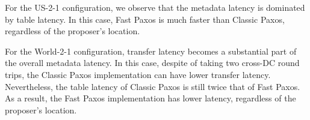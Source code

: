 %
%

%

For the US-2-1 configuration, we observe that the metadata latency is dominated by table latency. In this case, Fast Paxos is much faster than Classic Paxos, regardless of the proposer's location.

For the World-2-1 configuration, transfer latency becomes a substantial part of the overall metadata latency. In this case, despite of taking two cross-DC round trips, the Classic Paxos implementation can have lower transfer latency. Nevertheless, the table latency of Classic Paxos is still twice that of Fast Paxos. As a result, the Fast Paxos implementation has lower latency, regardless of the proposer's location.

